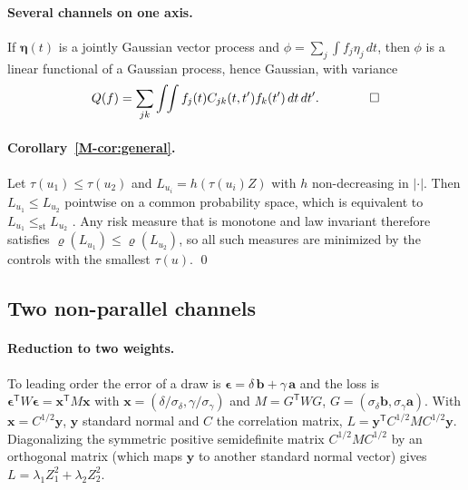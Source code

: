 \documentclass[aps,pra,onecolumn,notitlepage,superscriptaddress,nofootinbib,floatfix]{revtex4-2}
\begin{document}
\paragraph*{Several channels on one axis.} If $\boldsymbol\eta(t)$ is a jointly
Gaussian vector process and $\phi=\sum_j\int f_j\eta_j\,dt$, then $\phi$ is a
linear functional of a Gaussian process, hence Gaussian, with variance
\[Q(f)=\sum_{jk}\int\!\!\int f_j(t)C_{jk}(t,t')f_k(t')\,dt\,dt' .\qquad\qed\]

\paragraph*{Corollary~\ref{M-cor:general}.} Let $\tau(u_1)\le\tau(u_2)$ and
$L_{u_i}=h(\tau(u_i)Z)$ with $h$ non-decreasing in $|\cdot|$. Then
$L_{u_1}\le L_{u_2}$ pointwise on a common probability space, which is
equivalent to $L_{u_1}\le_{\mathrm{st}}L_{u_2}$ \cite{Shaked2007}. Any
risk measure that is monotone and law invariant therefore satisfies
$\varrho(L_{u_1})\le\varrho(L_{u_2})$, so all such measures are minimized by
the controls with the smallest $\tau(u)$. \qed

\subsection{Two non-parallel channels}
\label{sec:proofs-twoaxis}

\paragraph*{Reduction to two weights.} To leading order the error of a draw is
$\boldsymbol\epsilon=\delta\,\mathbf b+\gamma\,\mathbf a$ and the loss is
$\boldsymbol\epsilon^{\mathsf T}W\boldsymbol\epsilon=\mathbf x^{\mathsf T}M\mathbf x$
with $\mathbf x=(\delta/\sigma_\delta,\gamma/\sigma_\gamma)$ and
$M=G^{\mathsf T}WG$, $G=(\sigma_\delta\mathbf b,\sigma_\gamma\mathbf a)$. With
$\mathbf x=C^{1/2}\mathbf y$, $\mathbf y$ standard normal and $C$ the
correlation matrix, $L=\mathbf y^{\mathsf T}C^{1/2}MC^{1/2}\mathbf y$.
Diagonalizing the symmetric positive semidefinite matrix $C^{1/2}MC^{1/2}$ by
an orthogonal matrix (which maps $\mathbf y$ to another standard normal
vector) gives $L=\lambda_1Z_1^2+\lambda_2Z_2^2$.
\end{document}
